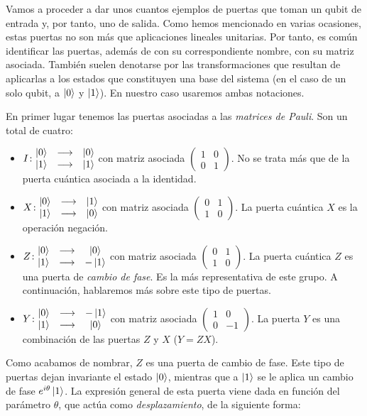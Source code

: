 Vamos a proceder a dar unos cuantos ejemplos de puertas que toman un qubit de entrada y, por tanto, uno de salida. Como hemos mencionado en varias ocasiones, estas puertas no son más que aplicaciones lineales unitarias. Por tanto, es común identificar las puertas, además de con su correspondiente nombre, con su matriz asociada. También suelen denotarse por las transformaciones que resultan de aplicarlas a los estados que constituyen una base del sistema (en el caso de un solo qubit, a $\left|0\right\rangle$ y $\left|1\right\rangle$). En nuestro caso usaremos ambas notaciones.

En primer lugar tenemos las puertas asociadas a las \textit{matrices de Pauli}. Son un total de cuatro:
\begin{itemize}
\item $I\colon \begin{matrix}\left|0\right\rangle&\longrightarrow& \left|0\right\rangle\\ \left|1\right\rangle&\longrightarrow& \left|1\right\rangle\end{matrix}$ con matriz asociada $\left(\begin{matrix}1&0\\ 0&1\end{matrix}\right)$. No se trata más que de la puerta cuántica asociada a la identidad.
\item $X\colon \begin{matrix}\left|0\right\rangle&\longrightarrow& \left|1\right\rangle\\ \left|1\right\rangle&\longrightarrow& \left|0\right\rangle\end{matrix}$ con matriz asociada $\left(\begin{matrix}0&1\\ 1&0\end{matrix}\right)$. La puerta cuántica $X$ es la operación negación.
\item $Z\colon \begin{matrix}\left|0\right\rangle&\longrightarrow& \left|0\right\rangle\\ \left|1\right\rangle&\longrightarrow& -\left|1\right\rangle\end{matrix}$ con matriz asociada $\left(\begin{matrix}0&1\\ 1&0\end{matrix}\right)$. La puerta cuántica $Z$ es una puerta de \textit{cambio de fase}. Es la más representativa de este grupo. A continuación, hablaremos más sobre este tipo de puertas.
\item $Y\colon \begin{matrix}\left|0\right\rangle&\longrightarrow& -\left|1\right\rangle\\ \left|1\right\rangle&\longrightarrow& \left|0\right\rangle\end{matrix}$ con matriz asociada $\left(\begin{matrix}1&0\\ 0&-1\end{matrix}\right)$. La puerta $Y$ es una combinación de las puertas $Z$ y $X$ ($Y=ZX$).
\end{itemize}

Como acabamos de nombrar, $Z$ es una puerta de cambio de fase. Este tipo de puertas dejan invariante el estado $\left|0\right\rangle$, mientras que a $\left|1\right\rangle$ se le aplica un cambio de fase $e^{i\theta}\left|1\right\rangle$. La expresión general de esta puerta viene dada en función del parámetro $\theta$, que actúa como \textit{desplazamiento}, de la siguiente forma:

